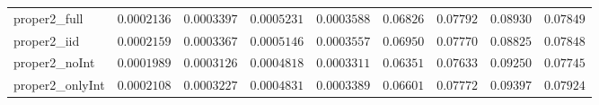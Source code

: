 \begin{table}
\begin{tabular}{lcccccccc}
proper2_full  & $0.0002136$ & $0.0003397$ & $0.0005231$ & $0.0003588$ & $0.06826$ & $0.07792$ & $0.08930$ & $0.07849$ \\
proper2_iid  & $0.0002159$ & $0.0003367$ & $0.0005146$ & $0.0003557$ & $0.06950$ & $0.07770$ & $0.08825$ & $0.07848$ \\
proper2_noInt  & $0.0001989$ & $0.0003126$ & $0.0004818$ & $0.0003311$ & $0.06351$ & $0.07633$ & $0.09250$ & $0.07745$ \\
proper2_onlyInt  & $0.0002108$ & $0.0003227$ & $0.0004831$ & $0.0003389$ & $0.06601$ & $0.07772$ & $0.09397$ & $0.07924$ \\
\hline 
\end{tabular}


\end{table}